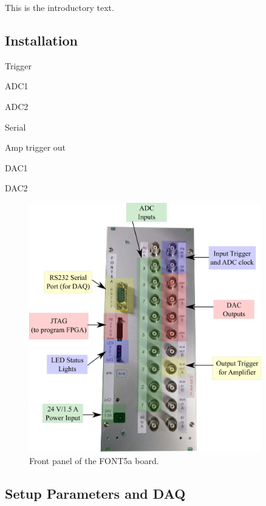 
This is the introductory text. \cite{Dummy}


\subsection{Installation}
\label{ss:fontInstall}


Trigger

ADC1

ADC2

Serial

Amp trigger out

DAC1

DAC2


\begin{figure}
  \centering
  \includegraphics[width=0.9\textwidth]{Figures/commissioning/FONT5aPanelPic}
  \caption{Front panel of the FONT5a board.}
  \label{f:FONT5aPanelPic}
\end{figure}


\subsection{Setup Parameters and DAQ}
\label{ss:fontDAQ}

